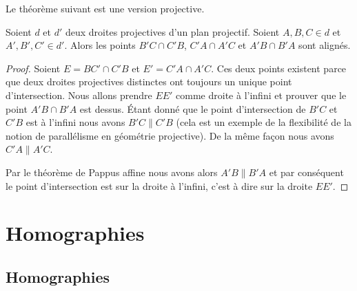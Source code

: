 Le théorème suivant est une version projective.
\begin{theorem}     
    Soient \( d\) et \( d'\) deux droites projectives d'un plan projectif. Soient \( A,B,C\in d\) et \( A',B',C'\in d'\). Alors les points \( B'C\cap C'B\), \( C'A\cap A'C\) et \( A'B\cap B'A\) sont alignés.
\end{theorem}

\begin{proof}
    Soient \( E=BC'\cap C'B\) et \( E'=C'A\cap A'C\). Ces deux points existent parce que deux droites projectives distinctes ont toujours un unique point d'intersection. Nous allons prendre \( EE'\) comme droite à l'infini et prouver que le point \( A'B\cap B'A\) est dessus. Étant donné que le point d'intersection de \( B'C\) et \( C'B\) est à l'infini nous avons \( B'C\parallel C'B\) (cela est un exemple de la flexibilité de la notion de parallélisme en géométrie projective). De la même façon nous avons \( C'A\parallel A'C\).

    Par le théorème de Pappus affine nous avons alors \( A'B\parallel B'A\) et par conséquent le point d'intersection est sur la droite à l'infini, c'est à dire sur la droite \( EE'\).
\end{proof}

\section{Homographies}

\subsection{Homographies}

